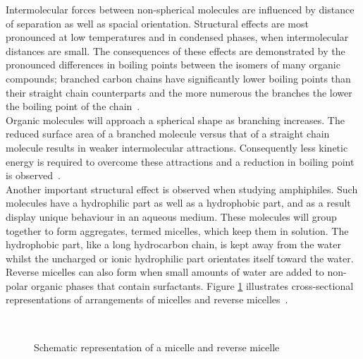 Intermolecular forces between non-spherical molecules are influenced by distance of separation as well as spacial orientation. Structural effects are most pronounced at low temperatures and in condensed phases, when intermolecular distances are small. The consequences of these effects are demonstrated by the pronounced differences in boiling points between the isomers of many organic compounds; branched carbon chains have significantly lower boiling points than their straight chain counterparts and the more numerous the branches the lower the boiling point of the chain~\cite{MolecularThermodynamicsOfFluidPhaseEquilibria}.\\

Organic molecules will approach a spherical shape as branching increases. The reduced surface area of a branched molecule versus that of a straight chain molecule results in weaker intermolecular attractions. Consequently less kinetic energy is required to overcome these attractions and a reduction in boiling point is observed~\cite{MolecularThermodynamicsOfFluidPhaseEquilibria}.\\

Another important structural effect is observed when studying amphiphiles. Such molecules have a hydrophilic part as well as a hydrophobic part, and as a result display unique behaviour in an aqueous medium. These molecules will group together to form aggregates, termed micelles, which keep them in solution. The hydrophobic part, like a long hydrocarbon chain, is kept away from the water whilst the uncharged or ionic hydrophilic part orientates itself toward the water.  Reverse micelles can also form when small amounts of water are added to non-polar organic phases that contain surfactants. Figure \ref{MicelleDrawing} illustrates cross-sectional representations of arrangements of micelles and reverse micelles~\cite{MolecularThermodynamicsOfFluidPhaseEquilibria}.\\

\begin{figure}
\begin{center}
\resizebox{0.7\textwidth}{!}{}\\
\end{center}
\caption{Schematic representation of a micelle and reverse micelle} \label{MicelleDrawing}
\end{figure}

